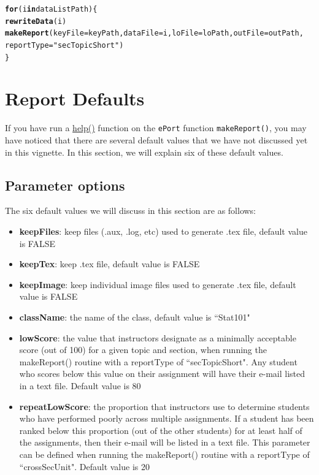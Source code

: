 \documentclass{article}\usepackage[]{graphicx}\usepackage[]{color}
\makeatletter
\newcommand{\hlstr}[1]{\textcolor[rgb]{0.192,0.494,0.8}{#1}}%
\newcommand{\hlstd}[1]{\textcolor[rgb]{0.345,0.345,0.345}{#1}}%
\newcommand{\hlkwa}[1]{\textcolor[rgb]{0.161,0.373,0.58}{\textbf{#1}}}%
\newcommand{\hlkwc}[1]{\textcolor[rgb]{0.333,0.667,0.333}{#1}}%
\newcommand{\hlkwd}[1]{\textcolor[rgb]{0.737,0.353,0.396}{\textbf{#1}}}%
\newenvironment{kframe}{%
 \def\at@end@of@kframe{}%
 \ifinner\ifhmode%
  \def\at@end@of@kframe{\end{minipage}}%
  \begin{minipage}{\columnwidth}%
 \fi\fi%
 \def\FrameCommand##1{\hskip\@totalleftmargin \hskip-\fboxsep
 \colorbox{shadecolor}{##1}\hskip-\fboxsep
     \hskip-\linewidth \hskip-\@totalleftmargin \hskip\columnwidth}%
 \MakeFramed {\advance\hsize-\width
   \@totalleftmargin\z@ \linewidth\hsize
   \@setminipage}}%
 {\par\unskip\endMakeFramed%
 \at@end@of@kframe}
\newenvironment{knitrout}{}{} %
\numberwithin{equation}{section} %
\makeatother
\begin{document}
\begin{knitrout}
\color{fgcolor}\begin{kframe}
\begin{alltt}
\hlkwa{for} \hlstd{(i} \hlkwa{in} \hlstd{dataListPath)\{}
  \hlkwd{rewriteData}\hlstd{(i)}
  \hlkwd{makeReport}\hlstd{(}\hlkwc{keyFile} \hlstd{= keyPath,} \hlkwc{dataFile} \hlstd{= i,} \hlkwc{loFile} \hlstd{= loPath,} \hlkwc{outFile} \hlstd{= outPath,}
    \hlkwc{reportType} \hlstd{=} \hlstr{"secTopicShort"}\hlstd{)}
\hlstd{\}}
\end{alltt}
\end{kframe}
\end{knitrout}

\section{Report Defaults}
\label{sec:repOptions}

If you have run a \hyperref[sec:helpSection]{help()} function on the \texttt{ePort} function \texttt{makeReport()}, you may have noticed that there are several default values that we have not discussed yet in this vignette. In this section, we will explain six of these default values.

\subsection{Parameter options}

The six default values we will discuss in this section are as follows:

\begin{itemize}
\item \textbf{keepFiles}: keep files (.aux, .log, etc) used to generate .tex file, default value is FALSE
\item \textbf{keepTex}: keep .tex file, default value is FALSE
\item \textbf{keepImage}: keep individual image files used to generate .tex file, default value is FALSE
\item \textbf{className}: the name of the class, default value is ``Stat101"
\item \textbf{lowScore}: the value that instructors designate as a minimally acceptable score (out of 100) for a given topic and section, when running the makeReport() routine with a reportType of ``secTopicShort". Any student who scores below this value on their assignment will have their e-mail listed in a text file. Default value is 80
\item \textbf{repeatLowScore}: the proportion that instructors use to determine students who have performed poorly across multiple assignments. If a student has been ranked below this proportion (out of the other students) for at least half of the assignments, then their e-mail will be listed in a text file. This parameter can be defined when running the makeReport() routine with a reportType of ``crossSecUnit". Default value is 20
\end{itemize}
\end{document}
